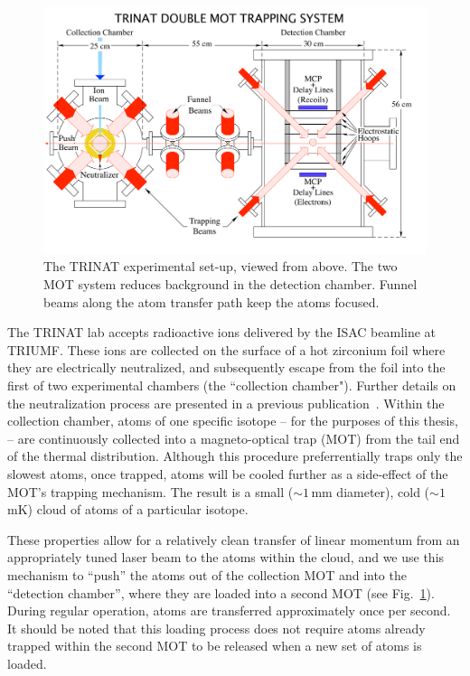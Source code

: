 \begin{figure}[t!h]
	\centering
	\includegraphics[width=.999\linewidth]
	{Figures/doublemot4.pdf}
	\caption{The TRINAT experimental set-up, viewed from above.  The two MOT system reduces background in the detection chamber.  Funnel beams along the atom transfer path keep the atoms focused.}	
	\label{fig:doublemot}
\end{figure}

The TRINAT lab accepts radioactive ions delivered by the ISAC beamline at TRIUMF.  These ions are collected on the surface of a hot zirconium foil where they are electrically neutralized, and subsequently escape from the foil into the first of two experimental chambers (the ``collection chamber").  Further details on the neutralization process are presented in a previous publication~\cite{gorelov2000}.  Within the collection chamber, atoms of one specific isotope -- for the purposes of this thesis,   -- are continuously collected into a magneto-optical trap (MOT) from the tail end of the thermal distribution.  Although this procedure preferrentially traps only the slowest atoms, once trapped, atoms will be cooled further as a side-effect of the MOT's trapping mechanism.  The result is a small ($\sim\!1\,$mm diameter), cold ($\sim\!1\,$mK) cloud of atoms of a particular isotope.  

These properties allow for a relatively clean transfer of linear momentum from an appropriately tuned laser beam to the atoms within the cloud, and we use this mechanism to ``push'' the atoms out of the collection MOT and into the ``detection chamber'', where they are loaded into a second MOT (see Fig.~\ref{fig:doublemot}).  During regular operation, atoms are transferred approximately once per second.  It should be noted that this loading process does not require atoms already trapped within the second MOT to be released when a new set of atoms is loaded.    

